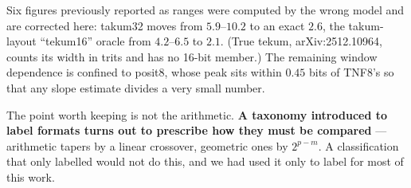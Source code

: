 \begin{table}[t]\centering\footnotesize 
\caption{Crossovers, computed by the model each taper's form requires. A
straight-line fit had overstated every geometric taper's reach, because a line
under-reports how fast a logarithm falls near the origin.}
\label{tab:crosscorrected}
\end{table}

Six figures previously reported as ranges were computed by the wrong model and
are corrected here: takum32 moves from $5.9$--$10.2$ to an exact $2.6$, the
takum-layout ``tekum16'' oracle
from $4.2$--$6.5$ to $2.1$. (True tekum, arXiv:2512.10964, counts its width in
trits and has no 16-bit member.) The remaining window dependence is confined to
posit8, whose peak sits within $0.45$ bits of TNF8's so that any slope estimate
divides a very small number.

The point worth keeping is not the arithmetic. \textbf{A taxonomy introduced to label
formats turns out to prescribe how they must be compared} --- arithmetic tapers
by a linear crossover, geometric ones by $2^{p-m}$. A classification that only
labelled would not do this, and we had used it only to label for most of this
work.



